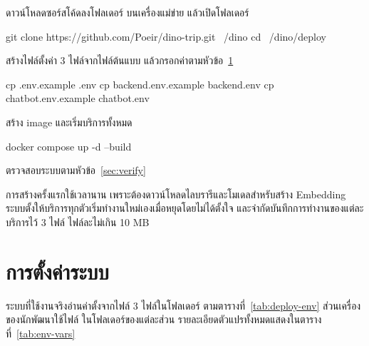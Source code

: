 \begin{steps}
  \item ดาวน์โหลดซอร์สโค้ดลงโฟลเดอร์  บนเครื่องแม่ข่าย แล้วเปิดโฟลเดอร์ 
\begin{terminal}
git clone https://github.com/Poeir/dino-trip.git ~/dino
cd ~/dino/deploy
\end{terminal}
  \item สร้างไฟล์ตั้งค่า 3 ไฟล์จากไฟล์ต้นแบบ แล้วกรอกค่าตามหัวข้อ~\ref{sec:config}
\begin{terminal}
cp .env.example .env
cp backend.env.example backend.env
cp chatbot.env.example chatbot.env
\end{terminal}
  \item สร้าง image และเริ่มบริการทั้งหมด
\begin{terminal}
docker compose up -d --build
\end{terminal}
  \item ตรวจสอบระบบตามหัวข้อ~\ref{sec:verify}
\end{steps}

\begin{note}
การสร้างครั้งแรกใช้เวลานาน เพราะต้องดาวน์โหลดไลบรารีและโมเดลสำหรับสร้าง Embedding ระบบตั้งให้บริการทุกตัวเริ่มทำงานใหม่เองเมื่อหยุดโดยไม่ได้ตั้งใจ และจำกัดบันทึกการทำงานของแต่ละบริการไว้ 3 ไฟล์ ไฟล์ละไม่เกิน 10 MB
\end{note}

\section{การตั้งค่าระบบ}
\label{sec:config}

ระบบที่ใช้งานจริงอ่านค่าตั้งจากไฟล์ 3 ไฟล์ในโฟลเดอร์  ตามตารางที่~\ref{tab:deploy-env} ส่วนเครื่องของนักพัฒนาใช้ไฟล์  ในโฟลเดอร์ของแต่ละส่วน รายละเอียดตัวแปรทั้งหมดแสดงในตารางที่~\ref{tab:env-vars}

